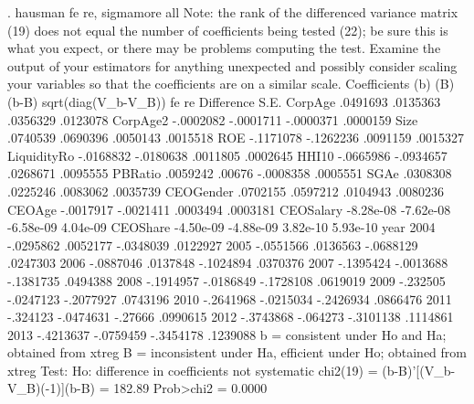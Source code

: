 . hausman fe re, sigmamore all
{\smallskip}
Note: the rank of the differenced variance matrix (19) does not equal the number of coefficients being tested (22); be sure this is what you expect, or there may be problems computing the test.  Examine the output of your estimators
        for anything unexpected and possibly consider scaling your variables so that the coefficients are on a similar scale.
{\smallskip}
                  Coefficients 
             {\VBAR}      (b)          (B)            (b-B)     sqrt(diag(V_b-V_B))
             {\VBAR}       fe           re         Difference          S.E.
     CorpAge {\VBAR}    .0491693     .0135363        .0356329        .0123078
    CorpAge2 {\VBAR}   -.0002082    -.0001711       -.0000371        .0000159
        Size {\VBAR}    .0740539     .0690396        .0050143        .0015518
         ROE {\VBAR}   -.1171078    -.1262236        .0091159        .0015327
LiquidityR{\tytilde}o {\VBAR}   -.0168832    -.0180638        .0011805        .0002645
       HHI10 {\VBAR}   -.0665986    -.0934657        .0268671        .0095555
     PBRatio {\VBAR}    .0059242       .00676       -.0008358        .0005551
        SGAe {\VBAR}    .0308308     .0225246        .0083062        .0035739
   CEOGender {\VBAR}    .0702155     .0597212        .0104943        .0080236
      CEOAge {\VBAR}   -.0017917    -.0021411        .0003494        .0003181
   CEOSalary {\VBAR}   -8.28e-08    -7.62e-08       -6.58e-09        4.04e-09
    CEOShare {\VBAR}   -4.50e-09    -4.88e-09        3.82e-10        5.93e-10
        year {\VBAR}
       2004  {\VBAR}   -.0295862     .0052177       -.0348039        .0122927
       2005  {\VBAR}   -.0551566     .0136563       -.0688129        .0247303
       2006  {\VBAR}   -.0887046     .0137848       -.1024894        .0370376
       2007  {\VBAR}   -.1395424    -.0013688       -.1381735        .0494388
       2008  {\VBAR}   -.1914957    -.0186849       -.1728108        .0619019
       2009  {\VBAR}    -.232505    -.0247123       -.2077927        .0743196
       2010  {\VBAR}   -.2641968    -.0215034       -.2426934        .0866476
       2011  {\VBAR}    -.324123    -.0474631         -.27666        .0990615
       2012  {\VBAR}   -.3743868     -.064273       -.3101138        .1114861
       2013  {\VBAR}   -.4213637    -.0759459       -.3454178        .1239088
                           b = consistent under Ho and Ha; obtained from xtreg
            B = inconsistent under Ha, efficient under Ho; obtained from xtreg
{\smallskip}
    Test:  Ho:  difference in coefficients not systematic
{\smallskip}
                 chi2(19) = (b-B)'[(V_b-V_B){\caret}(-1)](b-B)
                          =      182.89
                Prob>chi2 =      0.0000
{\smallskip}
